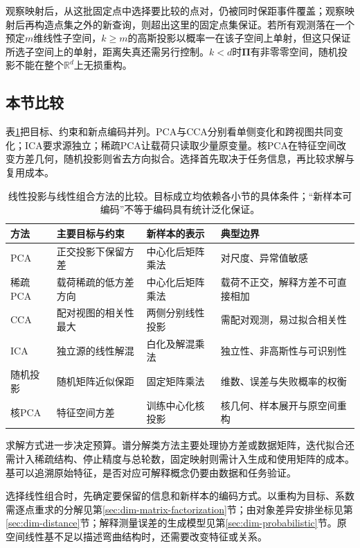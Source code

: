观察映射后，从这批固定点中选择要比较的点对，仍被同时保距事件覆盖；观察映射后再构造点集之外的新查询，则超出这里的固定点集保证。若所有观测落在一个预定$m$维线性子空间，$k\geq m$的高斯投影以概率一在该子空间上单射，但这只保证所选子空间上的单射，距离失真还需另行控制。$k<d$时$\bm\Pi$有非零零空间，随机投影不能在整个$\mathbb R^d$上无损重构。

\subsection{本节比较}
\label{sec:dim-linear-comparison}

表\ref{tab:dim-linear-comparison}把目标、约束和新点编码并列。PCA与CCA分别看单侧变化和跨视图共同变化；ICA要求源独立；稀疏PCA让载荷只读取少量原变量。核PCA在特征空间改变方差几何，随机投影则省去方向拟合。选择首先取决于任务信息，再比较求解与复用成本。

\begin{table}[htbp]
  \centering
  \small
  \begin{tabularx}{\linewidth}{@{}l>{\RaggedRight\arraybackslash}X>{\RaggedRight\arraybackslash}X>{\RaggedRight\arraybackslash}X@{}}
    \toprule
    方法 & 主要目标与约束 & 新样本的表示 & 典型边界\\
    \midrule
    PCA & 正交投影下保留方差 & 中心化后矩阵乘法 & 对尺度、异常值敏感\\
    稀疏PCA & 载荷稀疏的低方差方向 & 中心化后矩阵乘法 & 载荷不正交，解释方差不可直接相加\\
    CCA & 配对视图的相关性最大 & 两侧分别线性投影 & 需配对观测，易过拟合相关性\\
    ICA & 独立源的线性解混 & 白化及解混乘法 & 独立性、非高斯性与可识别性\\
    随机投影 & 随机矩阵近似保距 & 固定矩阵乘法 & 维数、误差与失败概率的权衡\\
    核PCA & 特征空间方差 & 训练中心化核投影 & 核几何、样本展开与原空间重构\\
    \bottomrule
  \end{tabularx}
  \caption{线性投影与线性组合方法的比较。目标成立均依赖各小节的具体条件；“新样本可编码”不等于编码具有统计泛化保证。}
  \label{tab:dim-linear-comparison}
\end{table}

求解方式进一步决定预算。谱分解类方法主要处理协方差或数据矩阵，迭代拟合还需计入稀疏结构、停止精度与总轮数，固定映射则需计入生成和使用矩阵的成本。基可以追溯原始特征，是否对应可解释概念仍要由数据和任务验证。

选择线性组合时，先确定要保留的信息和新样本的编码方式。以重构为目标、系数需逐点重求的分解见第\ref{sec:dim-matrix-factorization}节；由对象差异安排坐标见第\ref{sec:dim-distance}节；解释测量误差的生成模型见第\ref{sec:dim-probabilistic}节。原空间线性基不足以描述弯曲结构时，还需要改变特征或关系。

